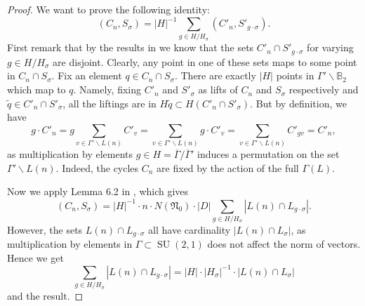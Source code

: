 \documentclass[12pt,a4paper,reqno]{amsart}
\theoremstyle{definition}
\numberwithin{definition}{subsection}
\theoremstyle{definition}
\numberwithin{Definition}{subsection}
\theoremstyle{remark}
\theoremstyle{remark}
\numberwithin{Remark}{subsection}
\theoremstyle{remark}
\theoremstyle{plain}
\numberwithin{Theorem}{subsection}
\theoremstyle{plain}
\theoremstyle{plain}
\theoremstyle{plain}
\theoremstyle{plain}
\theoremstyle{plain}
\theoremstyle{plain}
\theoremstyle{plain}
\DeclareMathOperator{\SU}{SU}
\begin{document}
\begin{proof}
We want to prove the following identity:
\[
(C_n, S_\sigma)=|H|^{-1}\sum_{g\in H/H_{\sigma}}(C'_n, S'_{g\cdot \sigma}).
\]
First remark that by the results in \cite[p. 120]{cogdell} we know that the sets $C'_n\cap  S'_{g\cdot \sigma}$ for varying $g\in H/H_{\sigma}$ are disjoint.
Clearly, any point in one of these sets maps to some point in $C_n\cap S_\sigma$.
Fix an element $q\in C_n\cap S_\sigma$. There are exactly $|H|$ points in $\Gamma'\backslash \mathbb{B}_2$ which map to $q$. Namely, fixing $C'_n$ and $S'_{\sigma}$ as lifts of $C_n$ and $S_\sigma$ respectively and $\tilde{q}\in C'_n\cap S'_{\sigma}$, all the liftings are in $H\tilde{q}\subset H(C'_n\cap S'_{\sigma})$. But by definition, we have
\[
g\cdot C'_n=g\sum_{v\in \Gamma'\backslash L(n)} C'_v=\sum_{v\in \Gamma'\backslash L(n)} g\cdot C'_v=\sum_{v\in \Gamma'\backslash L(n)} C'_{gv}=C'_n,
\]
as multiplication by elements $g\in H=\overline{\Gamma}/\overline{\Gamma}'$ induces a permutation on the set $\Gamma'\backslash L(n)$. Indeed, the cycles $C_n$ are fixed by the action of the full $\Gamma(L)$.

Now we apply Lemma 6.2 in \cite{cogdell}, which gives
\[
(C_n, S_\sigma)=|H|^{-1}\cdot n\cdot N(\mathfrak{N}_0)\cdot|D|\sum_{g\in H/H_{\sigma}} |L(n)\cap L_{g\cdot\sigma}|.
\]
However, the sets $L(n)\cap L_{g\cdot \sigma}$ all have cardinality $|L(n)\cap L_{\sigma}|$, as multiplication by elements in $\Gamma\subset \SU(2,1)$ does not affect the norm of vectors. Hence we get
\[
\sum_{g\in H/H_{\sigma}}|L(n)\cap L_{g\cdot \sigma}|=|H|\cdot|H_{\sigma}|^{-1}\cdot|L(n)\cap L_\sigma|
\]
and the result.
\end{proof}
\end{document}
